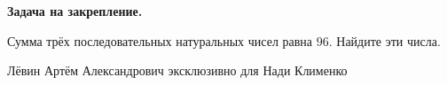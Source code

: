 \documentclass[12pt,a4paper]{article}
\begin{document}
\textbf{Задача на закрепление.}

Сумма трёх последовательных натуральных чисел равна $96$. Найдите эти числа.

\vfill
\begin{center}
\small Лёвин Артём Александрович эксклюзивно для Нади Клименко
\end{center}

\end{document}
